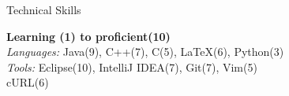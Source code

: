 \newcommand{\mar}{\hspace{.5cm}}
\newcommand{\separator}{\mar\rule[3pt]{9cm}{1pt}\\}
\vspace{1.5cm}
\raggedright
\footnotesize
\begin{center}
{\fontsize{24}{50}\selectfont Technical Skills}\\
\end{center}
\mar \textbf{Learning (1) to proficient(10)}\\
\mar\mar \textit{Languages:} Java(9), C++(7),  C(5), LaTeX(6), Python(3)\\
\vspace{5pt}
\mar\mar \textit{Tools:} \hspace{17pt} Eclipse(10), IntelliJ IDEA(7), Git(7), Vim(5)\\
\hspace{2.75cm}cURL(6)\\